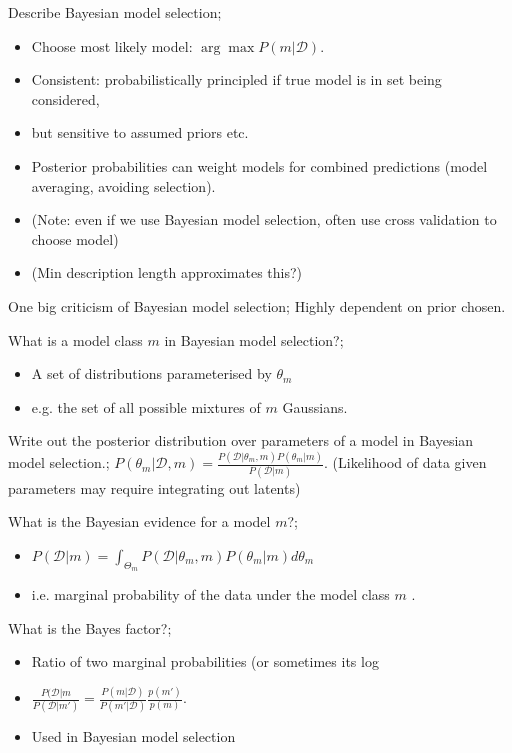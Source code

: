 \documentclass{article}
\begin{document}
Describe Bayesian model selection; \begin{itemize}
    \item Choose most likely model: $\arg\max P(m|\mathcal{D})$.
    \item Consistent: probabilistically principled if true model is in set being considered, 
    \item but sensitive to assumed priors etc.
    \item Posterior probabilities can weight models for combined predictions (model averaging, avoiding selection).
    \item (Note: even if we use Bayesian model selection, often use cross validation to choose model)
    \item (Min description length approximates this?)
\end{itemize}

One big criticism of Bayesian model selection; Highly dependent on prior chosen.

What is a model class $m$ in Bayesian model selection?; \begin{itemize}
    \item A set of distributions parameterised by $\theta_m$
    \item e.g. the set of all possible mixtures of $m$ Gaussians.
\end{itemize}

Write out the posterior distribution over parameters of a model in Bayesian model selection.; $P(\theta_m|\mathcal{D}, m) = \frac{P(\mathcal{D}|\theta_m, m)P(\theta_m|m)}{P(\mathcal{D}|m)}$. (Likelihood of data given parameters may require integrating out latents)

What is the Bayesian evidence for a model $m$?; \begin{itemize}
    \item $P(\mathcal{D}|m)=\int_{\Theta_m}P(\mathcal{D}|\theta_m, m)P(\theta_m|m)d\theta_m$
    \item i.e. marginal probability of the data under the model class $m$ .
\end{itemize}

What is the Bayes factor?; \begin{itemize}
    \item Ratio of two marginal probabilities (or sometimes its log
    \item $\frac{P(\mathcal{D}|m}{P(\mathcal{D}|m')}=\frac{P(m|\mathcal{D})}{P(m'|\mathcal{D})}\frac{p(m')}{p(m)}$.
    \item Used in Bayesian model selection
\end{itemize}
\end{document}
